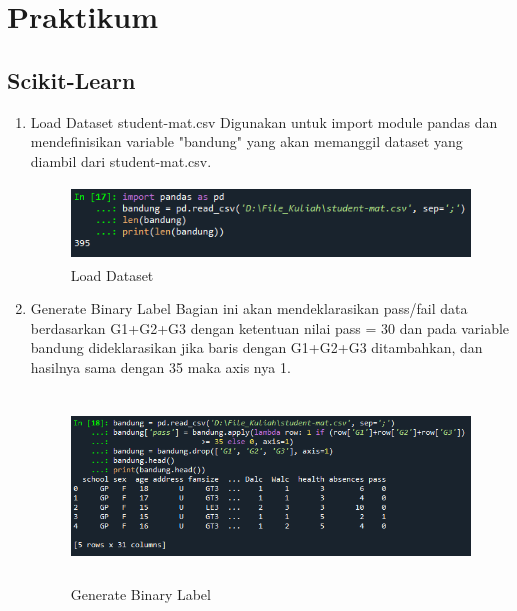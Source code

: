 \section{Praktikum}
	\subsection{Scikit-Learn}
\begin{enumerate}

\item Load Dataset student-mat.csv
\newline Digunakan untuk import module pandas dan mendefinisikan variable "bandung" yang akan memanggil dataset yang diambil dari student-mat.csv.
\begin{figure}[!htbp]
	\centering
	\includegraphics[width=11cm,height=2cm]{figures/load_dataset.png}
	\caption{Load Dataset}
	\label{penanda}
\end{figure}

\item Generate Binary Label
\newline Bagian ini akan mendeklarasikan pass/fail data berdasarkan G1+G2+G3 dengan ketentuan nilai pass = 30 dan pada variable bandung dideklarasikan jika baris dengan G1+G2+G3 ditambahkan, dan hasilnya sama dengan 35 maka axis nya 1.
\begin{figure}[!htbp]
	\centering
	\includegraphics[width=13cm,height=5cm]{figures/binary_label.png}
	\caption{Generate Binary Label}
	\label{penanda}
\end{figure}


\end{enumerate}
